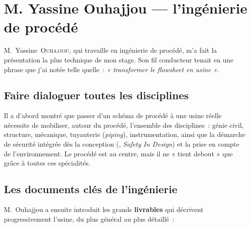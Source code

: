 \section{M. Yassine Ouhajjou --- l'ingénierie de procédé}

M.~Yassine~\textsc{Ouhajjou}, qui travaille en ingénierie de procédé, m'a fait la présentation la plus technique de mon stage. Son fil conducteur tenait en une phrase que j'ai notée telle quelle~: \textit{« transformer le \textit{flowsheet} en usine »}.

\subsection{Faire dialoguer toutes les disciplines}

Il a d'abord montré que passer d'un schéma de procédé à une usine réelle nécessite de mobiliser, autour du procédé, l'ensemble des disciplines~: génie civil, structure, mécanique, tuyauterie (\textit{piping}), instrumentation, ainsi que la démarche de sécurité intégrée dès la conception (, \textit{Safety In Design}) et la prise en compte de l'environnement. Le procédé est au centre, mais il ne « tient debout » que grâce à toutes ces spécialités.

\subsection{Les documents clés de l'ingénierie}

M.~Ouhajjou a ensuite introduit les grands \textbf{livrables} qui décrivent progressivement l'usine, du plus général au plus détaillé~:

\begin{center}
\label{fig:documents}
\end{center}

